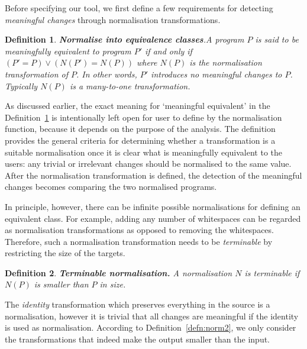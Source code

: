 \documentclass[10pt, conference, compsocconf]{IEEEtran}
\newtheorem{definition}{Definition}
\begin{document}
Before specifying our tool, we first define a few requirements for detecting {\em meaningful changes} through normalisation transformations.
\begin{definition}
{\bf Normalise into equivalence classes}.\label{defn:norm} A program $P$ is said to be {\em meaningfully equivalent} to program $P'$ if and only if $(P'=P) \vee (N(P') = N(P))$ where $N(P)$ is the normalisation transformation of $P$. In other words, $P'$ introduces no meaningful changes to $P$. Typically $N(P)$ is a many-to-one transformation.
\end{definition}

As discussed earlier, the exact meaning for `meaningful equivalent' in  the Definition~\ref{defn:norm} is intentionally left open for user to define by the normalisation function, because it depends on the purpose of the analysis. The definition provides the general criteria for determining whether a transformation is a suitable normalisation once it is clear what is meaningfully equivalent to the users: any trivial or irrelevant changes should be normalised to the same value. After the normalisation transformation is defined, the detection of the meaningful changes becomes comparing the two normalised programs. 

In principle, however, there can be infinite possible normalisations for defining an equivalent class. For example, adding any number of whitespaces can be regarded as normalisation transformations as opposed to removing the whitespaces. 
Therefore, such a normalisation transformation needs to be {\em terminable} by restricting the size of the targets.
\begin{definition}
{\bf Terminable normalisation.\label{defn:norm2}} A normalisation $N$ is {\em terminable} if $N(P)$ is smaller than $P$ in size.
\end{definition}
The {\em identity} transformation which preserves everything in the source is a normalisation, however it is trivial that all changes are meaningful if the identity is used as normalisation. According to Definition~\ref{defn:norm2}, we only consider the transformations that indeed make the output smaller than the input.
\end{document}
